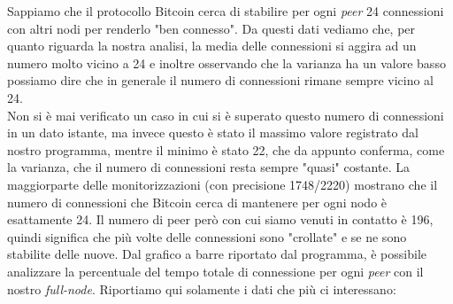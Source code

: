\begin{table}[h!]
    \label{tab:table1}
\end{table}
Sappiamo che il protocollo Bitcoin cerca di stabilire per ogni \textit{peer} 24 connessioni con altri nodi per renderlo "ben connesso". Da questi dati vediamo che, per quanto riguarda la nostra analisi, la media delle connessioni si aggira ad un numero molto vicino a 24 e inoltre osservando che la varianza ha un valore basso possiamo dire che in generale il numero di connessioni rimane sempre vicino al 24.\\
Non si \`e mai verificato un caso in cui si \`e superato questo numero di connessioni in un dato istante, ma invece questo \`e stato il massimo valore registrato dal nostro programma, mentre il minimo \`e stato 22, che da appunto conferma, come la varianza, che il numero di connessioni resta sempre "quasi" costante. La maggiorparte delle monitorizzazioni (con precisione 1748/2220) mostrano che il numero di connessioni che Bitcoin cerca di mantenere per ogni nodo \`e esattamente 24.
Il numero di peer per\`o con cui siamo venuti in contatto \`e 196, quindi significa che pi\`u volte delle connessioni sono "crollate" e se ne sono stabilite delle nuove.
Dal grafico a barre riportato dal programma, \`e possibile analizzare la percentuale del tempo totale di connessione per ogni \textit{peer} con il nostro \textit{full-node}. Riportiamo qui solamente i dati che pi\`u ci interessano:\\\\
\begin{table}[h!]
    \label{tab:table1}
\end{table}
